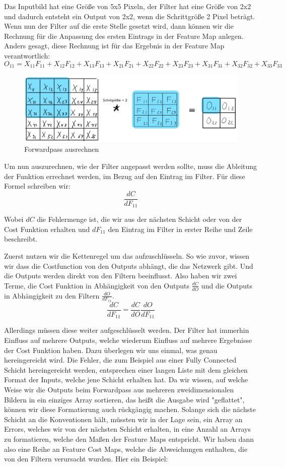 \documentclass[12pt]{article}
\begin{document}
Das Inputbild hat eine Größe von 5x5 Pixeln, der Filter hat eine Größe von 2x2 und dadurch entsteht ein Output von 2x2, wenn die Schrittgröße 2 Pixel beträgt. 
Wenn nun der Filter auf die erste Stelle gesetzt wird, dann können wir die Rechnung für die Anpassung des ersten Eintrags in der Feature Map anlegen. Anders gesagt, diese Rechnung ist für das Ergebnis in der Feature Map verantwortlich:
$$O_{11} = X_{11}F_{11}+X_{12}F_{12}+X_{13}F_{13}+X_{21}F_{21}+X_{22}F_{22}+X_{23}F_{23}+X_{31}F_{31}+X_{32}F_{32}+X_{33}F_{33}$$
\begin{figure}[H]
\centering
\includegraphics[scale=0.270]{./Images/011_Forward_Pass_ausrechnen_O11.png}
\caption{Forwardpass ausrechnen}
\label{Forwardpass ausrechnen}
\end{figure}

Um nun auszurechnen, wie der Filter angepasst werden sollte, muss die Ableitung der Funktion errechnet werden, im Bezug auf den Eintrag im Filter. Für diese Formel schreiben wir:
$$\frac{dC}{dF_{11}}$$

Wobei $dC$ die Fehlermenge ist, die wir aus der nächsten Schicht oder von der Cost Funktion erhalten und $dF_{11}$ den Eintrag im Filter in erster Reihe und Zeile beschreibt.

Zuerst nutzen wir die Kettenregel um das aufzuschlüsseln. So wie zuvor, wissen wir dass die Costfunction von den Outputs abhängt, die das Netzwerk gibt. Und die Outputs werden direkt von den Filtern beeinflusst. Also haben wir zwei Terme, die Cost Funktion in Abhängigkeit von den Outputs $\frac{dC} {dO} $ und die Outputs in Abhängigkeit zu den Filtern $ \frac{dO} {dF_{11}}$.
$$\frac{dC}{dF_{11}} = \frac{dC} {dO} \frac{dO} {dF_{11}}$$

Allerdings müssen diese weiter aufgeschlüsselt werden. Der Filter hat immerhin Einfluss auf mehrere Outputs, welche wiederum Einfluss auf mehrere Ergebnisse der Cost Funktion haben. Dazu überlegen wir uns einmal, was genau hereingereicht wird. Die Fehler, die zum Beispiel aus einer Fully Connected Schicht hereingereicht werden, entsprechen einer langen Liste mit dem gleichen Format der Inputs, welche jene Schicht erhalten hat. Da wir wissen, auf welche Weise wir die Outputs beim Forwardpass aus mehreren zweidimensionalen Bildern in ein einziges Array sortieren, das heißt die Ausgabe wird "geflattet", können wir diese Formatierung auch rückgängig machen. Solange sich die nächste Schicht an die Konventionen hält, müssten wir in der Lage sein, ein Array an Errors, welches wir von der nächsten Schicht erhalten, in eine Anzahl an Arrays zu formatieren, welche den Maßen der Feature Maps entspricht.
Wir haben dann also eine Reihe an Feature Cost Maps, welche die Abweichungen enthalten, die von den Filtern verursacht wurden. Hier ein Beispiel:
\end{document}
